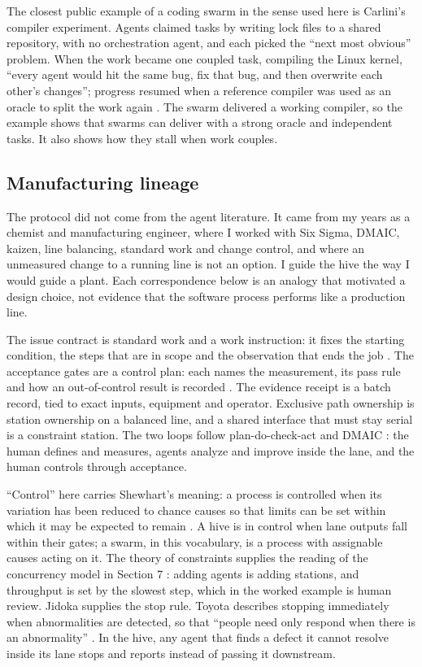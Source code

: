 \documentclass[11pt]{article}
\begin{document}
The closest public example of a coding swarm in the sense used here is Carlini's compiler experiment. Agents claimed tasks by writing lock files to a shared repository, with no orchestration agent, and each picked the ``next most obvious'' problem. When the work became one coupled task, compiling the Linux kernel, ``every agent would hit the same bug, fix that bug, and then overwrite each other's changes''; progress resumed when a reference compiler was used as an oracle to split the work again \cite{carlini2026}. The swarm delivered a working compiler, so the example shows that swarms can deliver with a strong oracle and independent tasks. It also shows how they stall when work couples.

\subsection{Manufacturing lineage}

The protocol did not come from the agent literature. It came from my years as a chemist and manufacturing engineer, where I worked with Six Sigma, DMAIC, kaizen, line balancing, standard work and change control, and where an unmeasured change to a running line is not an option. I guide the hive the way I would guide a plant. Each correspondence below is an analogy that motivated a design choice, not evidence that the software process performs like a production line.

The issue contract is standard work and a work instruction: it fixes the starting condition, the steps that are in scope and the observation that ends the job \cite{ohno}. The acceptance gates are a control plan: each names the measurement, its pass rule and how an out-of-control result is recorded \cite{aiag}. The evidence receipt is a batch record, tied to exact inputs, equipment and operator. Exclusive path ownership is station ownership on a balanced line, and a shared interface that must stay serial is a constraint station. The two loops follow plan-do-check-act \cite{deming} and DMAIC \cite{harry}: the human defines and measures, agents analyze and improve inside the lane, and the human controls through acceptance.

``Control'' here carries Shewhart's meaning: a process is controlled when its variation has been reduced to chance causes so that limits can be set within which it may be expected to remain \cite{shewhart1930}. A hive is in control when lane outputs fall within their gates; a swarm, in this vocabulary, is a process with assignable causes acting on it. The theory of constraints supplies the reading of the concurrency model in Section 7 \cite{goldratt}: adding agents is adding stations, and throughput is set by the slowest step, which in the worked example is human review. Jidoka supplies the stop rule. Toyota describes stopping immediately when abnormalities are detected, so that ``people need only respond when there is an abnormality'' \cite{toyota,liker}. In the hive, any agent that finds a defect it cannot resolve inside its lane stops and reports instead of passing it downstream.
\end{document}
